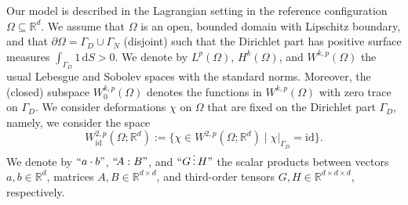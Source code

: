 \documentclass[a4paper,12pt]{article}
\newcommand{\R}{\mathbb{R}}
\newcommand{\pl}{\partial}
\newcommand{\dS}{\mathrm{\,d}S}
\newcommand{\id}{\mathrm{id}}
\theoremstyle{plain}
\theoremstyle{definition}
\newcommand{\tdots}{\,\vdots\,}
\numberwithin{equation}{section}
\begin{document}
Our model is described in the Lagrangian setting in the 
reference configuration $\Omega\subseteq \R^d$. We assume that 
$\Omega$ is an open, bounded domain with Lipschitz boundary, and that 
$\pl\Omega = \Gamma_D\cup\Gamma_N$ (disjoint) such that the Dirichlet part has positive surface measures $\int_{\Gamma_D} 1 \dS > 0$. We denote by $L^p(\Omega)$, $H^k(\Omega)$, and $W^{k,p}(\Omega)$ the usual Lebesgue and Sobolev spaces with the standard norms. Moreover, the (closed) subspace 
$W^{k,p}_0(\Omega)$ denotes the functions in $W^{k,p}(\Omega)$ with zero trace on $\Gamma_D$.
We consider deformations $\chi$ on $\Omega$ that are fixed on the Dirichlet part $\Gamma_D$, namely,
we consider the space
\[
W^{2,p}_\id(\Omega;\R^d) := \{\chi\in W^{2,p}(\Omega;\R^d) \mid \chi|_{\Gamma_D} = \id \}.
\] 
We denote by $``a\cdot b"$, $``\!A:B"$, and $``G \tdots H "$ 
the scalar products between vectors $a,b\in\R^d$, matrices $A,B\in \R^{d\times d}$, and third-order tensors $G,H\in\R^{d\times d\times d}$, respectively. 
\end{document}

